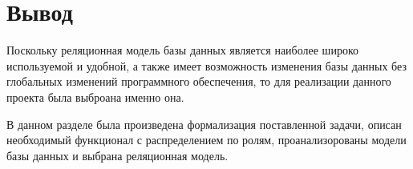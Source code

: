 \section*{Вывод}

Поскольку реляционная модель базы данных является наиболее широко используемой и удобной, а также имеет возможность изменения базы данных без глобальных изменений программного обеспечения, то для реализации данного проекта была выброана именно она.

В данном разделе была произведена формализация поставленной задачи, описан необходимый функционал с распределением по ролям, проанализорованы модели базы данных и выбрана реляционная модель.